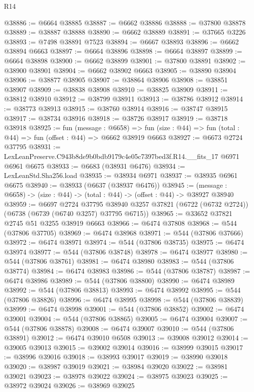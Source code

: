 \begin{lexlean}{R14}
\begin{coremodule}
@38886 := @6664 @38885
@38887 := @6662 @38886
@38888 := @37800 @38878
@38889 := @38887 @38888
@38890 := @6662 @38889
@38891 := @37665 @3226
@38893 := @7498 @38891 @7523
@38894 := @6667 @38893
@38896 := @6662 @38894 @6663
@38897 := @6664 @38896
@38898 := @6664 @38897
@38899 := @6664 @38898
@38900 := @6662 @38899
@38901 := @37800 @38891
@38902 := @38900 @38901
@38904 := @6662 @38902 @6663
@38905 := @38890 @38904
@38906 := @38877 @38905
@38907 := @38864 @38906
@38908 := @38851 @38907
@38909 := @38838 @38908
@38910 := @38825 @38909
@38911 := @38812 @38910
@38912 := @38799 @38911
@38913 := @38786 @38912
@38914 := @38773 @38913
@38915 := @38760 @38914
@38916 := @38747 @38915
@38917 := @38734 @38916
@38918 := @38726 @38917
@38919 := @38718 @38918
@38925 := fun (message : @6658) =>
  fun (size : @44) => fun (total : @44) => fun (offset : @44) => @6662 @38919 @6663
@38927 := @6673 @2724 @37795
@38931 := LexLeanPreserve.C943b8de9b0bdb9179c4e05c7397bed3f.R14.__fits_17 @6971 @6961 @6675
@38933 := @6683 (@38931 @6476)
@38934 := LexLeanStd.Sha256.load
@38935 := @38934 @6971
@38937 := @38935 @6961 @6675
@38940 := @38933 (@6637 (@38937 @6476))
@38945 := (message : @6658) -> (size : @44) -> (total : @44) -> (offset : @44) -> @38927 @38940
@38959 := @6697
    @2724
    @37795
    @38940
    @3257
    @37821
    (@6722 (@6732 @2724))
    (@6738 (@6739 (@6740 @3257) @37795 @6715))
@38965 := @33652 @37821 @2745 @51 @3255 @38919 @6663
@38966 := @6474 @37808
@38968 := @544 (@37806 @37705)
@38969 := @6474 @38968
@38971 := @544 (@37806 @37666)
@38972 := @6474 @38971
@38974 := @544 (@37806 @38735)
@38975 := @6474 @38974
@38977 := @544 (@37806 @38748)
@38978 := @6474 @38977
@38980 := @544 (@37806 @38761)
@38981 := @6474 @38980
@38983 := @544 (@37806 @38774)
@38984 := @6474 @38983
@38986 := @544 (@37806 @38787)
@38987 := @6474 @38986
@38989 := @544 (@37806 @38800)
@38990 := @6474 @38989
@38992 := @544 (@37806 @38813)
@38993 := @6474 @38992
@38995 := @544 (@37806 @38826)
@38996 := @6474 @38995
@38998 := @544 (@37806 @38839)
@38999 := @6474 @38998
@39001 := @544 (@37806 @38852)
@39002 := @6474 @39001
@39004 := @544 (@37806 @38865)
@39005 := @6474 @39004
@39007 := @544 (@37806 @38878)
@39008 := @6474 @39007
@39010 := @544 (@37806 @38891)
@39012 := @6474 @39010 @6508
@39013 := @39008 @39012
@39014 := @39005 @39013
@39015 := @39002 @39014
@39016 := @38999 @39015
@39017 := @38996 @39016
@39018 := @38993 @39017
@39019 := @38990 @39018
@39020 := @38987 @39019
@39021 := @38984 @39020
@39022 := @38981 @39021
@39023 := @38978 @39022
@39024 := @38975 @39023
@39025 := @38972 @39024
@39026 := @38969 @39025

\end{coremodule}
\end{lexlean}
